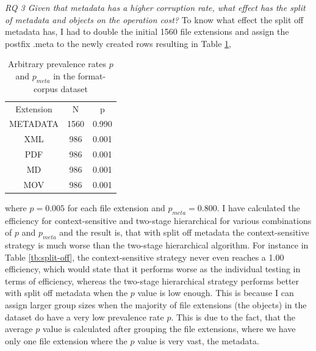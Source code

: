 \textit{RQ 3 Given that metadata has a higher corruption rate, what effect has the split of metadata and objects on the operation cost?}
To know what effect the split off metadata has, I had to double the initial 1560 file extensions and assign the postfix .meta to the newly created rows resulting in Table \ref{tb:metadata},
\begin{table}[b]
    \caption{Arbitrary prevalence rates $p$ and $p_{meta}$ in the format-corpus dataset}
    \centering
    \begin{tabular}{c c c}
    \label{tb:metadata}
    Extension & N & p\\
    METADATA & 1560 & 0.990 \\
    XML& 986 & 0.001 \\
    PDF& 986 & 0.001 \\
    MD& 986 & 0.001 \\
    MOV& 986 & 0.001 
    \end{tabular}
\end{table}
where $p=0.005$ for each file extension and $p_{meta}=0.800$. 
I have calculated the efficiency for context-sensitive and two-stage hierarchical for various combinations of $p$ and $p_{meta}$ and the result is, that with split off metadata the context-sensitive strategy is much worse than the two-stage hierarchical algorithm.
For instance in Table \ref{tb:split-off}, the context-sensitive strategy never even reaches a 1.00 efficiency, which would state that it performs worse as the individual testing in terms of efficiency, whereas the two-stage hierarchical strategy performs better with split off metadata when the $p$ value is low enough. This is because I can assign larger group sizes when the majority of file extensions (the objects) in the dataset do have a very low prevalence rate $p$. This is due to the fact, that the average $p$ value is calculated after grouping the file extensions, where we have only one file extension where the $p$ value is very vast, the metadata.
